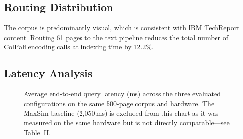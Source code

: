 \documentclass[conference]{IEEEtran}
\begin{document}
\subsection{Routing Distribution}
 
\begin{table}[htbp]
\caption{Router Distribution on 500-Page Corpus}
\begin{center}
\end{center}
\label{tab:routing}
\end{table}
\FloatBarrier
 
The corpus is predominantly visual, which is consistent with IBM TechReport content. Routing 61 pages to the text pipeline reduces the total number of ColPali encoding calls at indexing time by 12.2\%.
 
\subsection{Latency Analysis}
 
\begin{figure}[htbp]
\begin{center}
\caption{Average end-to-end query latency (ms) across the three evaluated configurations on the same 500-page corpus and hardware. The MaxSim baseline (2,050\,ms) is excluded from this chart as it was measured on the same hardware but is not directly comparable—see Table~II.}
\label{fig:latency_chart}
\end{center}
\end{figure}
 
\end{document}
